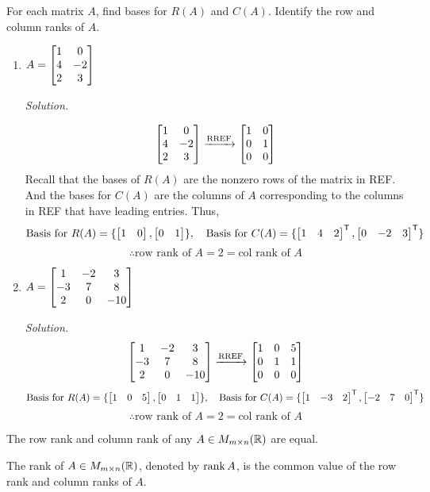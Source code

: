 \begin{example}
For each matrix $A$, find bases for $R(A)$ and $C(A)$. Identify the
row and column ranks of $A$.
\begin{enumerate}
    \item $A = \begin{bmatrix} 1 & 0 \\ 4 & -2 \\ 2 & 3 \end{bmatrix}$
    
    \textit{Solution.} 

    $$\begin{bmatrix} 1 & 0 \\ 4 & -2 \\ 2 & 3 \end{bmatrix} \xrightarrow{\text{RREF}} \begin{bmatrix} 1 & 0 \\ 0 & 1 \\ 0 & 0 \end{bmatrix}$$
    Recall that the bases of $R(A)$ are the nonzero rows of the matrix in REF. And 
    the bases for $C(A)$ are the columns of $A$ corresponding to the columns in REF 
    that have leading entries. Thus,
    $$\text{Basis for }R(A) = \{\begin{bmatrix} 1 & 0 \end{bmatrix}, \begin{bmatrix} 0 & 1 \end{bmatrix}\}, \quad \text{Basis for }C(A) = \{\begin{bmatrix} 1 & 4 & 2 \end{bmatrix}^{\mathsf{T}}, \begin{bmatrix} 0 & -2 & 3 \end{bmatrix}^{\mathsf{T}}\}$$
    $$\therefore \text{row rank of }A = 2 = \text{col rank of } A$$

    \item $A = \begin{bmatrix} 1 & -2 & 3 \\ -3 & 7 & 8 \\ 2 & 0 & -10 \end{bmatrix}$
    
    \textit{Solution.}
    $$\begin{bmatrix} 1 & -2 & 3 \\ -3 & 7 & 8 \\ 2 & 0 & -10 \end{bmatrix} \xrightarrow{\text{RREF}} \begin{bmatrix} 1 & 0 & 5 \\ 0 & 1 & 1 \\ 0 & 0 & 0 \end{bmatrix}$$
    $$\text{Basis for }R(A) = \{\begin{bmatrix} 1 & 0 & 5 \end{bmatrix}, \begin{bmatrix} 0 & 1 & 1 \end{bmatrix}\}, \quad \text{Basis for }C(A) = \{\begin{bmatrix} 1 & -3 & 2 \end{bmatrix}^{\mathsf{T}}, \begin{bmatrix} -2 & 7 & 0 \end{bmatrix}^{\mathsf{T}}\}$$
    $$\therefore \text{row rank of }A = 2 = \text{col rank of } A$$

\end{enumerate}
\end{example}

\begin{theorem}
The row rank and column rank of any $A \in M_{m \times n}(\mathbb{R})$ are equal.
\end{theorem}

\begin{definition}
The rank of $A \in M_{m \times n}(\mathbb{R})$, denoted by $\rank A$, is the common value of the row rank and column ranks of $A$.
\end{definition}

